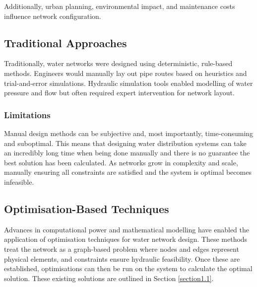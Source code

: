 Additionally, urban planning, environmental impact, and maintenance costs influence network configuration.
\subsection{Traditional Approaches}
Traditionally, water networks were designed using deterministic, rule-based methods. Engineers would manually lay out pipe routes based on heuristics and trial-and-error simulations. Hydraulic simulation tools enabled modelling of water pressure and flow but often required expert intervention for network layout. \citep{w11030562}
\subsubsection{Limitations}
Manual design methods can be subjective and, most importantly, time-consuming and suboptimal. This means that designing water distribution systems can take an incredibly long time when being done manually and there is no guarantee the best solution has been calculated. As networks grow in complexity and scale, manually ensuring all constraints are satisfied and the system is optimal becomes infeasible. \citep{Zhou2022}

\subsection{Optimisation-Based Techniques}\label{optimisationinwater}
Advances in computational power and mathematical modelling have enabled the application of optimisation techniques for water network design. These methods treat the network as a graph-based problem where nodes and edges represent physical elements, and constraints ensure hydraulic feasibility. Once these are established, optimisations can then be run on the system to calculate the optimal solution. These existing solutions are outlined in Section \ref{section1.1}.

